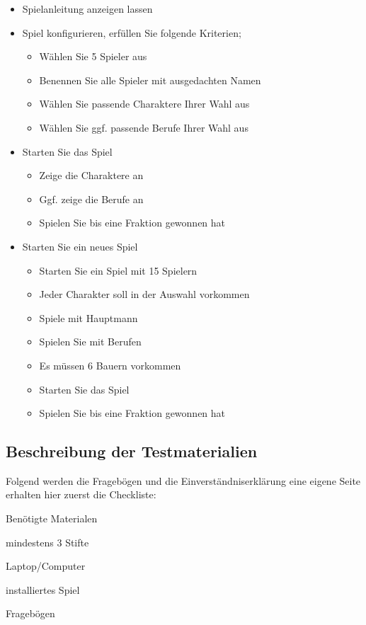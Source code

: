 \begin{large}
\begin{itemize}
    	\item Spielanleitung anzeigen lassen
    	\item Spiel konfigurieren, erfüllen Sie folgende Kriterien;
    	\begin{itemize}
    		\item Wählen Sie 5 Spieler aus
    		\item Benennen Sie alle Spieler mit ausgedachten Namen
    		\item Wählen Sie passende Charaktere Ihrer Wahl aus
    		\item Wählen Sie ggf. passende Berufe Ihrer Wahl aus
    	\end{itemize}
    	\item Starten Sie das Spiel
 		\begin{itemize}
 			\item Zeige die Charaktere an
 			\item Ggf. zeige die Berufe an
 			\item Spielen Sie bis eine Fraktion gewonnen hat
 		\end{itemize}   	
 		\item Starten Sie ein neues Spiel
 		\begin{itemize}
 			\item Starten Sie ein Spiel mit 15 Spielern 
 			\item Jeder Charakter soll in der Auswahl vorkommen 
 			\item Spiele mit Hauptmann
 			\item Spielen Sie mit Berufen
 			\item Es müssen 6 Bauern vorkommen
 			\item Starten Sie das Spiel 
 			\item Spielen Sie bis eine Fraktion gewonnen hat
 		\end{itemize}
    	\end{itemize}
\end{large}

	\subsection{Beschreibung der Testmaterialien}
    Folgend werden die Fragebögen und die Einverständniserklärung eine eigene Seite erhalten hier zuerst die Checkliste:
    \begin{itemize}
  \item Benötigte Materialen
  \begin{todolist}
    \item mindestens 3 Stifte
    \item Laptop/Computer
    \begin{todolist}
      \item installiertes Spiel
    \end{todolist}
    \item Fragebögen
  \end{todolist}
\end{itemize}

